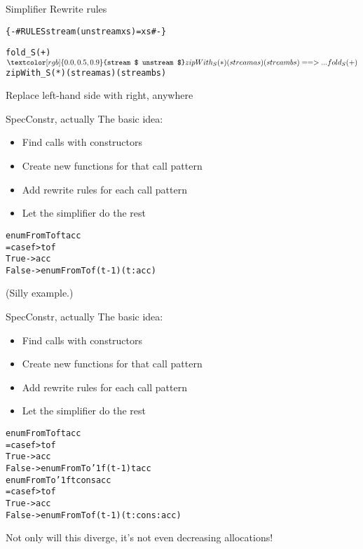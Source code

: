 \documentclass[t]{beamer}
\newcommand{\oomph}[1]{\textcolor[rgb]{0.0,0.5,0.9}{#1}}
\begin{document}
\begin{frame}[fragile]{Simplifier}
Rewrite rules
\begin{alltt}\Large
\{-# RULES \oomph{stream (unstream xs)} = xs #-\}

fold_S (+) $ \oomph{stream $ unstream $}
zipWith_S (*) (stream as) (stream bs)
==>
...
fold_S (+) $
zipWith_S (*) (stream as) (stream bs)
\end{alltt}
Replace left-hand side with right, anywhere
\end{frame}

\begin{frame}[fragile]{SpecConstr, actually}
The basic idea:
\begin{itemize}
\item Find calls with constructors
\item Create new functions for that call pattern
\item Add rewrite rules for each call pattern
\item Let the simplifier do the rest
\end{itemize}

\begin{alltt}
enumFromTo f t acc
 = case f > t of
   True  -> acc
   False -> \oomph{enumFromTo f (t-1) (t : acc)}
\end{alltt}

(Silly example.)

\end{frame}

\begin{frame}[fragile]{SpecConstr, actually}
The basic idea:
\begin{itemize}
\item Find calls with constructors
\item Create new functions for that call pattern
\item Add rewrite rules for each call pattern
\item Let the simplifier do the rest
\end{itemize}

\begin{alltt}
enumFromTo f t acc
 = case f > t of
   True  -> acc
   False -> enumFromTo'1 f (t-1) t acc
\oomph{enumFromTo'1 f t cons acc
 = case f > t of
   True  -> acc
   False -> enumFromTo f (t-1) (t : cons : acc)}
\end{alltt}
Not only will this diverge, it's not even decreasing allocations!
\end{frame}
\end{document}
